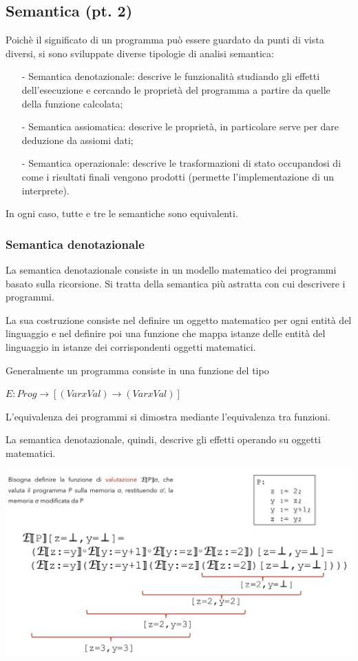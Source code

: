 \documentclass[a4paper, 10pt]{report}
\begin{document}
\subsection*{Semantica (pt. 2)}

Poichè il significato di un programma può essere guardato da punti di vista diversi, si sono sviluppate diverse tipologie di analisi semantica:
\begin{itemize}
\item[-] Semantica denotazionale: descrive le funzionalità studiando gli effetti dell'esecuzione e cercando le proprietà del programma a partire da quelle della funzione calcolata;
\item[-] Semantica assiomatica: descrive le proprietà, in particolare serve per dare deduzione da assiomi dati;
\item[-] Semantica operazionale: descrive le trasformazioni di stato occupandosi di come i risultati finali vengono prodotti (permette l'implementazione di un interprete).
\end{itemize}

\noindent In ogni caso, tutte e tre le semantiche sono equivalenti.

\subsubsection*{Semantica denotazionale}
La semantica denotazionale consiste in un modello matematico dei programmi basato sulla ricorsione. Si tratta della semantica più astratta con cui descrivere i programmi.

La sua costruzione consiste   nel   definire   un   oggetto matematico  per  ogni  entità  del  linguaggio  e  nel  definire poi   una   funzione   che   mappa   istanze   delle   entità   del linguaggio   in   istanze   dei   corrispondenti   oggetti matematici.

Generalmente un programma consiste in una funzione del tipo

\begin{center}
$E: Prog \rightarrow [(Var x Val) \rightarrow (Var x Val)]$
\end{center}

\noindent L'equivalenza dei programmi si dimostra mediante l'equivalenza tra funzioni.

\noindent La semantica denotazionale, quindi, descrive gli effetti operando su oggetti matematici.

\begin{center}
\includegraphics[scale=0.75]{immagine01.pdf}
\end{center}
\end{document}
